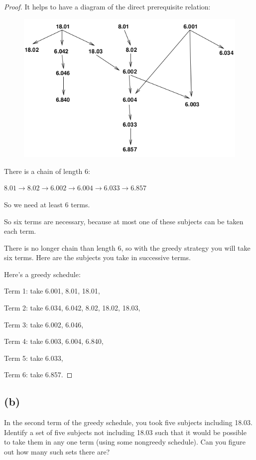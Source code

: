 \documentclass[14pt]{extarticle}
\begin{document}
\begin{proof}
It helps to have a diagram of the direct prerequisite relation:

\begin{figure}[ht!]
\centering
\includegraphics[scale=0.75]{prereq.png}
\end{figure}

There is a chain of length 6:

$8.01 \to 8.02 \to 6.002 \to 6.004 \to 6.033 \to 6.857$

So we need at least 6 terms. 

So six terms are necessary, because at most one of these subjects can be taken each term.

There is no longer chain than length 6, so with the greedy strategy you will take six terms. Here are the subjects you take in successive terms.

Here's a greedy schedule:

Term 1: take 6.001, 8.01, 18.01, 

Term 2: take 6.034, 6.042, 8.02, 18.02, 18.03, 

Term 3: take 6.002, 6.046,

Term 4: take 6.003, 6.004, 6.840,

Term 5: take 6.033,

Term 6: take 6.857.
\end{proof}

\subsection{(b)}
In the second term of the greedy schedule, you took five subjects including 18.03. Identify a set of five subjects not including 18.03 such that it would be possible to take them in any one term (using some nongreedy schedule). Can you figure out how many such sets there are?
\end{document}
